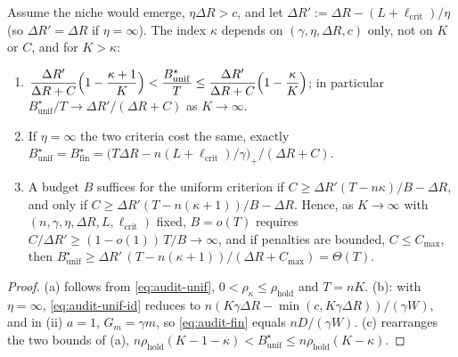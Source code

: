 \begin{corollary}
\label{cor:audit-tradeoff}
Assume the niche would emerge, $\eta\Delta R>c$, and let
$\Delta R':=\Delta R-(L+\ell_{\mathrm{crit}})/\eta$ (so $\Delta R'=\Delta R$ if
$\eta=\infty$). The index $\kappa$ depends on $(\gamma,\eta,\Delta R,c)$ only,
not on $K$ or $C$, and for $K>\kappa$:
\begin{enumerate}
\item[\textup{(a)}] $\displaystyle
 \frac{\Delta R'}{\Delta R+C}\Bigl(1-\frac{\kappa+1}{K}\Bigr)<
 \frac{B^\star_{\mathrm{unif}}}{T}\le\frac{\Delta R'}{\Delta R+C}\Bigl(1-\frac{\kappa}{K}\Bigr)$;
 in particular $B^\star_{\mathrm{unif}}/T\to\Delta R'/(\Delta R+C)$ as
 $K\to\infty$.
\item[\textup{(b)}] If $\eta=\infty$ the two criteria cost the same, exactly
 $B^\star_{\mathrm{unif}}=B^\star_{\mathrm{fin}}
 =\bigl(T\Delta R-n(L+\ell_{\mathrm{crit}})/\gamma\bigr)_+/(\Delta R+C)$.
\item[\textup{(c)}] A budget $B$ suffices for the uniform criterion if
 $C\ge\Delta R'(T-n\kappa)/B-\Delta R$, and only if
 $C\ge\Delta R'(T-n(\kappa+1))/B-\Delta R$. Hence, as $K\to\infty$ with
 $(n,\gamma,\eta,\Delta R,L,\ell_{\mathrm{crit}})$ fixed, $B=o(T)$ requires
 $C/\Delta R'\ge(1-o(1))\,T/B\to\infty$, and if penalties are bounded,
 $C\le C_{\max}$, then
 $B^\star_{\mathrm{unif}}\ge\Delta R'\,(T-n(\kappa+1))/(\Delta R+C_{\max})=\Theta(T)$.
\end{enumerate}
\end{corollary}
\begin{proof}
(a) follows from \eqref{eq:audit-unif}, $0<\rho_\kappa\le\rho_{\mathrm{hold}}$
and $T=nK$. (b): with $\eta=\infty$, \eqref{eq:audit-unif-id} reduces to
$n(K\gamma\Delta R-\min(c,K\gamma\Delta R))/(\gamma W)$, and in (ii) $a=1$,
$G_m=\gamma m$, so \eqref{eq:audit-fin} equals $nD/(\gamma W)$. (c) rearranges
the two bounds of (a), $n\rho_{\mathrm{hold}}(K-1-\kappa)<B^\star_{\mathrm{unif}}
\le n\rho_{\mathrm{hold}}(K-\kappa)$.
\end{proof}

